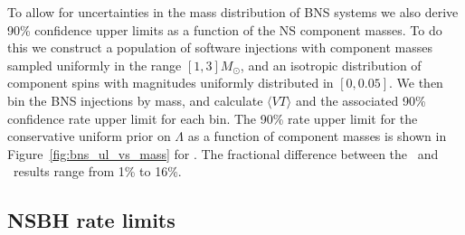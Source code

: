 To allow for uncertainties in the mass distribution of \ac{BNS} systems we also
derive 90\% confidence upper limits as a function of the \ac{NS} component masses.
To do this we construct a population of software injections with component masses
sampled uniformly in the range $[1, 3]M_{\odot}$, and an isotropic distribution
of component spins with magnitudes uniformly distributed in $[0, 0.05]$. We then bin
the \ac{BNS} injections by mass, and calculate $\langle VT \rangle$ and the associated 90\%
confidence rate upper limit for each bin. The 90\% rate upper limit for the conservative
uniform prior on $\Lambda$ as a function of component masses is shown in 
Figure~\ref{fig:bns_ul_vs_mass} for \pycbc. The fractional difference between the \pycbc\
and \gstlal\ results range from 1\% to 16\%.


\subsection{NSBH rate limits}
\label{ssec:nsbh_rate_limits}

